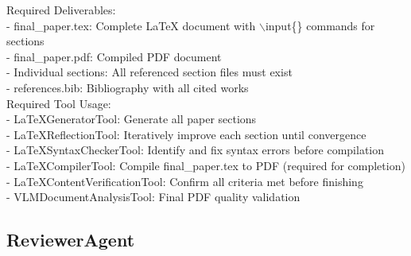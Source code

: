\documentclass{article}
\begin{document}
\begin{tcolorbox}[colback=purple!5,colframe=purple!50,title=WriteupAgent System Prompt,breakable]
Required Deliverables:\\
- final\_paper.tex: Complete LaTeX document with $\backslash$input\{\} commands for sections\\
- final\_paper.pdf: Compiled PDF document\\
- Individual sections: All referenced section files must exist\\
- references.bib: Bibliography with all cited works\\

Required Tool Usage:\\
- LaTeXGeneratorTool: Generate all paper sections\\
- LaTeXReflectionTool: Iteratively improve each section until convergence\\
- LaTeXSyntaxCheckerTool: Identify and fix syntax errors before compilation\\
- LaTeXCompilerTool: Compile final\_paper.tex to PDF (required for completion)\\
- LaTeXContentVerificationTool: Confirm all criteria met before finishing\\
- VLMDocumentAnalysisTool: Final PDF quality validation
\end{tcolorbox}

\subsection{ReviewerAgent}
\label{subsec:reviewer_prompt}
\end{document}
